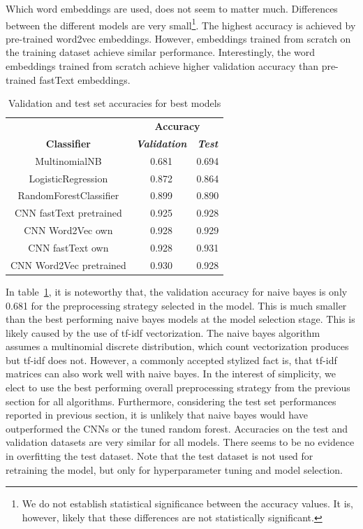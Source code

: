 \documentclass[conference]{IEEEtran}
\begin{document}
Which word embeddings are used, does not seem to matter much. Differences between the different models are very small\footnote{We do not establish statistical significance between the accuracy values. It is, however, likely that these differences are not statistically significant.}. The highest accuracy is achieved by pre-trained word2vec embeddings. However, embeddings trained from scratch on the training dataset achieve similar performance. Interestingly, the word embeddings trained from scratch achieve higher validation accuracy than pre-trained fastText embeddings. 

\begin{table}[htbp]
\caption{Validation and test set accuracies for best models}
\begin{center}
\begin{tabular}{|c|c|c|}
\hline
\textbf{}&\multicolumn{2}{|c|}{\textbf{Accuracy}} \\ 
\cline{2-3}
\textbf{Classifier} & \textbf{\textit{Validation}}& \textbf{\textit{Test}} \\ 
\hline
MultinomialNB & 0.681 & 0.694 \\ 
\hline
LogisticRegression & 0.872 & 0.864 \\ 
\hline
RandomForestClassifier & 0.899 & 0.890 \\ 
\hline
CNN fastText pretrained & 0.925 & 0.928 \\ 
\hline
CNN Word2Vec own & 0.928 & 0.929 \\ 
\hline
CNN fastText own & 0.928 & 0.931 \\ 
\hline
CNN Word2Vec pretrained & 0.930 & 0.928 \\ 
\hline
\end{tabular}
\label{tab1}
\end{center}
\end{table}

In table~\ref{tab1}, it is noteworthy that, the validation accuracy for naive bayes is only 0.681 for the preprocessing strategy selected in the model. This is much smaller than the best performing naive bayes models at the model selection stage. This is likely caused by the use of tf-idf vectorization. The naive bayes algorithm assumes  a multinomial discrete distribution, which count vectorization produces but tf-idf does not. However, a commonly accepted stylized fact is, that tf-idf matrices can also work well with naive bayes. In the interest of simplicity, we elect to use the best performing overall preprocessing strategy from the previous section for all algorithms. Furthermore, considering the test set performances reported in previous section, it is unlikely that naive bayes would have outperformed the CNNs or the tuned random forest. Accuracies on the test and validation datasets are very similar for all models. There seems to be no evidence in overfitting the test dataset. Note that the test dataset is not used for retraining the model, but only for hyperparameter tuning and model selection.
\end{document}

